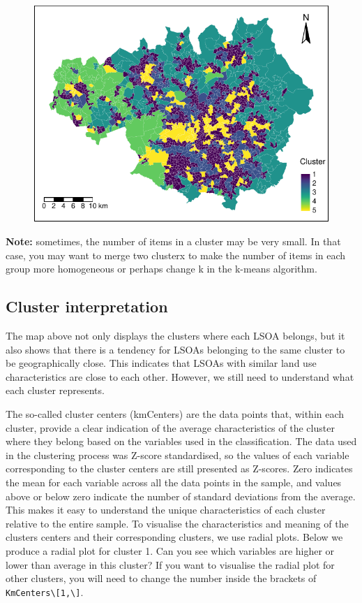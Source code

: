 \documentclass[
  letterpaper,
  DIV=11,
  numbers=noendperiod]{scrreprt}
\begin{document}
\begin{figure}[H]

{\centering \includegraphics{geodemographics_files/figure-pdf/unnamed-chunk-18-1.pdf}

}

\end{figure}

\textbf{Note:} sometimes, the number of items in a cluster may be very
small. In that case, you may want to merge two clusterx to make the
number of items in each group more homogeneous or perhaps change k in
the k-means algorithm.

\hypertarget{cluster-interpretation}{%
\subsection{Cluster interpretation}\label{cluster-interpretation}}

The map above not only displays the clusters where each LSOA belongs,
but it also shows that there is a tendency for LSOAs belonging to the
same cluster to be geographically close. This indicates that LSOAs with
similar land use characteristics are close to each other. However, we
still need to understand what each cluster represents.

The so-called cluster centers (kmCenters) are the data points that,
within each cluster, provide a clear indication of the average
characteristics of the cluster where they belong based on the variables
used in the classification. The data used in the clustering process was
Z-score standardised, so the values of each variable corresponding to
the cluster centers are still presented as Z-scores. Zero indicates the
mean for each variable across all the data points in the sample, and
values above or below zero indicate the number of standard deviations
from the average. This makes it easy to understand the unique
characteristics of each cluster relative to the entire sample. To
visualise the characteristics and meaning of the clusters centers and
their corresponding clusters, we use radial plots. Below we produce a
radial plot for cluster 1. Can you see which variables are higher or
lower than average in this cluster? If you want to visualise the radial
plot for other clusters, you will need to change the number inside the
brackets of \texttt{KmCenters\textbackslash{}{[}1,\textbackslash{}{]}}.
\end{document}
